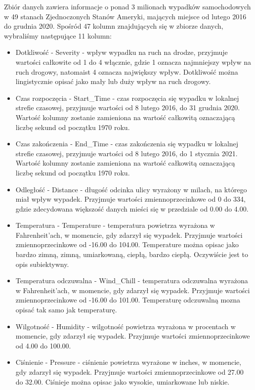 \documentclass{classrep}
\begin{document}
Zbiór danych zawiera informacje o ponad 3 milionach wypadków samochodowych w 49 stanach Zjednoczonych Stanów Ameryki, mających miejsce od lutego 2016 do grudnia 2020. Spośród 47 kolumn znajdujących się w zbiorze danych, wybraliśmy następujące 11 kolumn:
\begin{itemize}
\item Dotkliwość - Severity - wpływ wypadku na ruch na drodze, przyjmuje wartości całkowite od 1 do 4 włącznie, gdzie 1 oznacza najmniejszy wpływ na ruch drogowy, natomaist 4 oznacza największy wpływ. Dotkliwość można lingistycznie opisać jako mały lub duży wpływ na ruch drogowy.
\item Czas rozpoczęcia - Start\_Time - czas rozpoczęcia się wypadku w lokalnej strefie czasowej, przyjmuje wartości od 8 lutego 2016, do 31 grudnia 2020. Wartość kolumny zostanie zamieniona na wartość całkowitą oznaczającą liczbę sekund od początku 1970 roku.
\item Czas zakończenia - End\_Time - czas zakończenia się wypadku w lokalnej strefie czasowej, przyjmuje wartości od 8 lutego 2016, do 1 stycznia 2021. Wartość kolumny zostanie zamieniona na wartość całkowitą oznaczającą liczbę sekund od początku 1970 roku. 
\item Odległość - Distance - długość odcinka ulicy wyrażony w milach, na którego miał wpływ wypadek. Przyjmuje wartości zmiennoprzecinkowe od 0 do 334, gdzie zdecydowana większość danych mieści się w przedziale od 0.00 do 4.00. 
\item Temperatura - Temperature - temperatura powietrza wyrażona w Fahrenheit'ach, w momencie, gdy zdarzył się wypadek.  Przyjmuje wartości zmiennoprzecinkowe od -16.00 do 104.00.  Temperature można opisac jako bardzo zimną, zimną, umiarkowaną, ciepłą, bardzo ciepłą. Oczywiście jest to opis subiektywny.
\item Temperatura odczuwalna - Wind\_Chill - temperatura odczuwalna wyrażona w Fahrenheit'ach, w momencie, gdy zdarzył się wypadek.  Przyjmuje wartości zmiennoprzecinkowe od -16.00 do 101.00. Temperaturę odczuwalną mozna opisać tak samo jak temperaturę.
\item Wilgotność - Humidity - wilgotność powietrza wyrażona w procentach w momencie, gdy zdarzył się wypadek. Przyjmuje wartości zmiennoprzecinkowe od 4.00 do 100.00. 
\item Ciśnienie - Pressure - ciśnienie powietrza wyrażone w inches, w momencie, gdy zdarzył się wypadek. Przyjmuje wartości zmiennoprzecinkowe od 27.00 do 32.00. Ciśnieje można opisac jako wysokie, umiarkowane lub niskie. 

\end{itemize}
\end{document}
